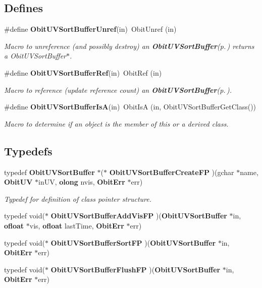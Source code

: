 \subsection*{Defines}
\begin{CompactItemize}
\item 
\#define {\bf Obit\-UVSort\-Buffer\-Unref}(in)\ Obit\-Unref (in)
\begin{CompactList}\small\item\em Macro to unreference (and possibly destroy) an {\bf Obit\-UVSort\-Buffer}{\rm (p.\,\pageref{structObitUVSortBuffer})} returns a Obit\-UVSort\-Buffer$\ast$. \item\end{CompactList}\item 
\#define {\bf Obit\-UVSort\-Buffer\-Ref}(in)\ Obit\-Ref (in)
\begin{CompactList}\small\item\em Macro to reference (update reference count) an {\bf Obit\-UVSort\-Buffer}{\rm (p.\,\pageref{structObitUVSortBuffer})}. \item\end{CompactList}\item 
\#define {\bf Obit\-UVSort\-Buffer\-Is\-A}(in)\ Obit\-Is\-A (in, Obit\-UVSort\-Buffer\-Get\-Class())
\begin{CompactList}\small\item\em Macro to determine if an object is the member of this or a derived class. \item\end{CompactList}\end{CompactItemize}
\subsection*{Typedefs}
\begin{CompactItemize}
\item 
typedef {\bf Obit\-UVSort\-Buffer} $\ast$($\ast$ {\bf Obit\-UVSort\-Buffer\-Create\-FP} )(gchar $\ast$name, {\bf Obit\-UV} $\ast$in\-UV, {\bf olong} nvis, {\bf Obit\-Err} $\ast$err)
\begin{CompactList}\small\item\em Typedef for definition of class pointer structure. \item\end{CompactList}\item 
typedef void($\ast$ {\bf Obit\-UVSort\-Buffer\-Add\-Vis\-FP} )({\bf Obit\-UVSort\-Buffer} $\ast$in, {\bf ofloat} $\ast$vis, {\bf ofloat} last\-Time, {\bf Obit\-Err} $\ast$err)
\item 
typedef void($\ast$ {\bf Obit\-UVSort\-Buffer\-Sort\-FP} )({\bf Obit\-UVSort\-Buffer} $\ast$in, {\bf Obit\-Err} $\ast$err)
\item 
typedef void($\ast$ {\bf Obit\-UVSort\-Buffer\-Flush\-FP} )({\bf Obit\-UVSort\-Buffer} $\ast$in, {\bf Obit\-Err} $\ast$err)
\end{CompactItemize}
